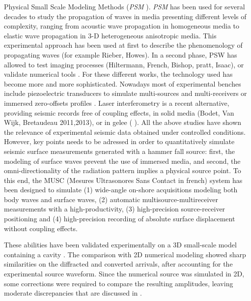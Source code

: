 \documentclass[manuscript,revised]{geophysics}
\newcommand{\psm}{\textit{PSM} }
\newcommand{\thrd}{3-D }
\begin{document}
\noindent Physical Small Scale Modeling Methods (\psm). \psm has been used for several decades to study the propagation of waves in media presenting different levels of complexity, ranging from acoustic wave propagation in homogeneous media to elastic wave propagation in \thrd heterogeneous anisotropic media. This experimental approach has been used at first to describe the phenomenology of propagating waves (for example  Rieber, Howes). In a second phase, PSW has allowed to test imaging processes (Hiltermann, French, Bishop, pratt, Isaac), or validate numerical tools \citep{Favretto_NMT_2013}. For these different works, the technology used has become more and more sophisticated. Nowadays most of experimental benches include piezoelectric transducers to simulate multi-sources and multi-receivers \citep{Wong_SPM_2009} or immersed zero-offsets profiles \citep{Favretto_NMT_2013}. Laser interferometry is a recent alternative, providing seismic records free of coupling effects, in solid media (Bodet, Van Wijk, Bretaudeau 2011,2013), or in gelee ( ). All the above studies have shown the relevance of experimental seismic data obtained under controlled conditions. However, key points needs to be adressed in order to quantitatively simulate seismic surface measurements generated with a hammer fall source: first, the modeling of surface waves prevent the use of immersed media, and second, the omni-directionality of the radiation pattern implies a physical source point. To this end, the MUSC (Mesures Ultrasonores Sans Contact in french) system has been designed \citep{Bretaudeau_SSM_2011} to simulate (1) wide-angle on-shore acquisitions modeling both body waves and surface waves, (2) automatic multisource-multireceiver measurements with a high-productivity, (3) high-precision source-receiver positioning and (4) high-precision recording of absolute surface displacement without coupling effects. 

\noindent These abilities have been validated  experimentally on a 3D small-scale model  containing a cavity \citep{Bretaudeau_SSM_2011}. The comparison with 2D numerical modeling showed sharp similarities on the diffracted and converted arrivals, after accounting for the experimental source waveform. Since the numerical source was simulated in 2D, some corrections were required to compare the resulting amplitudes, leaving moderate discrepancies that are discussed in \citet{Bretaudeau_SSM_2011}. 

\end{document}
